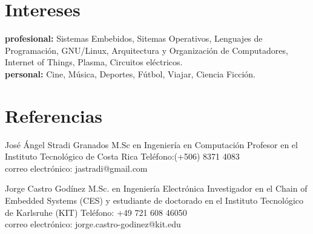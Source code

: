 \documentclass[]{friggeri-cv} %
\begin{document}

\section{Intereses}
  \vspace{-0.2cm}

\textbf{profesional:} Sistemas Embebidos, Sitemas Operativos, Lenguajes de Programación, 
GNU/Linux, Arquitectura y Organización de Computadores, Internet of Things, Plasma, Circuitos eléctricos. \\
\textbf{personal:}  Cine, Música, Deportes, Fútbol, Viajar, Ciencia Ficción.


\newpage


\section{Referencias}


\begin{entrylist}

\entry
{}
{José Ángel Stradi Granados}
{M.Sc en Ingeniería en Computación}
{Profesor en el Instituto Tecnológico de Costa Rica}
{Teléfono:(+506) 8371 4083 \\
correo electrónico: jastradi@gmail.com
}


\entry
{}
{Jorge Castro Godínez}
{M.Sc. en Ingeniería Electrónica}
{Investigador en el Chain of Embedded Systems (CES) y estudiante de doctorado en el Instituto Tecnológico de Karlsruhe (KIT)}
{Teléfono: +49 721 608 46050 \\
correo electrónico: jorge.castro-godinez@kit.edu
}

\end{entrylist} 

\end{document}

